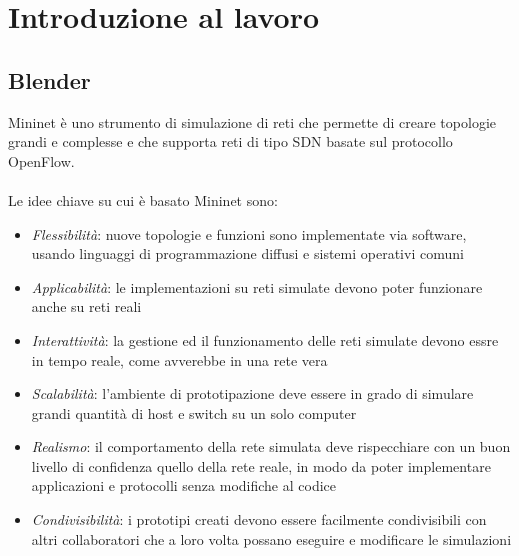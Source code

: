\chapter{Introduzione al lavoro}\label{ch:capitolo2}

\section{Blender}\label{ch:2.1}
Mininet è uno strumento di simulazione di reti che permette di creare topologie grandi e complesse e che supporta reti di tipo SDN basate sul protocollo OpenFlow.\\\\
Le idee chiave su cui è basato Mininet sono:
\begin{itemize}
	\item \textit{Flessibilità}: nuove topologie e funzioni sono implementate via software, usando linguaggi di programmazione diffusi e sistemi operativi comuni
	\item \textit{Applicabilità}: le implementazioni su reti simulate devono poter funzionare anche su reti reali
	\item \textit{Interattività}: la gestione ed il funzionamento delle reti simulate devono essre in tempo reale, come avverebbe in una rete vera
	\item \textit{Scalabilità}: l'ambiente di prototipazione deve essere in grado di simulare grandi quantità di host e switch su un solo computer
	\item \textit{Realismo}: il comportamento della rete simulata deve rispecchiare con un buon livello di confidenza quello della rete reale, in modo da poter implementare applicazioni e protocolli senza modifiche al codice
	\item \textit{Condivisibilità}: i prototipi creati devono essere facilmente condivisibili con altri collaboratori che a loro volta possano eseguire e modificare le simulazioni \cite{mn2}
\end{itemize}

